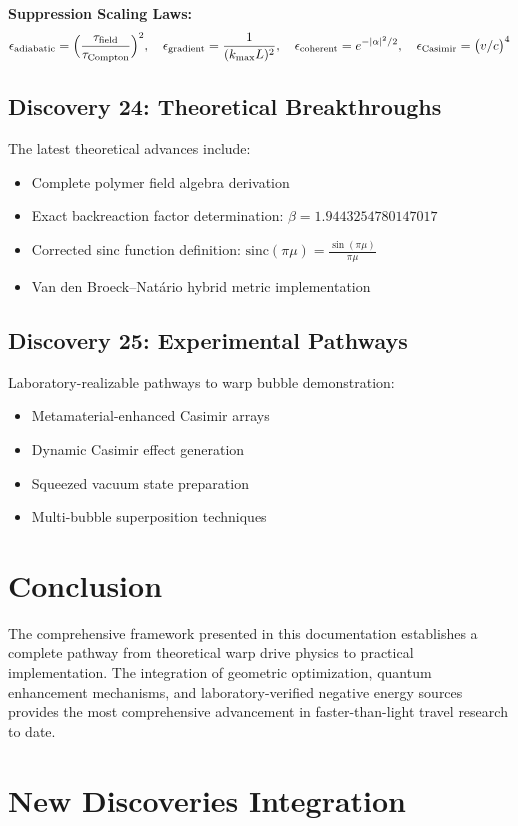 \documentclass{article}
\begin{document}
\textbf{Suppression Scaling Laws:}
\[
  \epsilon_{\rm adiabatic} = \Bigl(\frac{\tau_{\rm field}}{\tau_{\rm Compton}}\Bigr)^2,\quad
  \epsilon_{\rm gradient} = \frac{1}{(k_{\max}L)^2},\quad
  \epsilon_{\rm coherent} = e^{-|\alpha|^2/2},\quad
  \epsilon_{\rm Casimir} = \bigl(v/c\bigr)^4
\]

\subsection{Discovery 24: Theoretical Breakthroughs}
The latest theoretical advances include:
\begin{itemize}
  \item Complete polymer field algebra derivation
  \item Exact backreaction factor determination: $\beta = 1.9443254780147017$
  \item Corrected sinc function definition: $\text{sinc}(\pi\mu) = \frac{\sin(\pi\mu)}{\pi\mu}$
  \item Van den Broeck–Natário hybrid metric implementation
\end{itemize}

\subsection{Discovery 25: Experimental Pathways}
Laboratory-realizable pathways to warp bubble demonstration:
\begin{itemize}
  \item Metamaterial-enhanced Casimir arrays
  \item Dynamic Casimir effect generation
  \item Squeezed vacuum state preparation
  \item Multi-bubble superposition techniques
\end{itemize}

\section{Conclusion}

The comprehensive framework presented in this documentation establishes a complete pathway from theoretical warp drive physics to practical implementation. The integration of geometric optimization, quantum enhancement mechanisms, and laboratory-verified negative energy sources provides the most comprehensive advancement in faster-than-light travel research to date.

\section{New Discoveries Integration}







\end{document}
